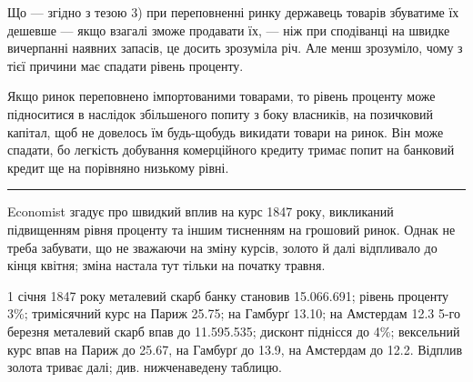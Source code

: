 
Що — згідно з тезою 3) при переповненні ринку державець товарів збуватиме
їх дешевше — якщо взагалі зможе продавати їх, — ніж при сподіванці на
швидке вичерпанні наявних запасів, це досить зрозуміла річ. Але менш зрозуміло,
чому з тієї причини має спадати рівень проценту.

Якщо ринок переповнено імпортованими товарами, то рівень проценту може
підноситися в наслідок збільшеного попиту з боку власників, на позичковий
капітал, щоб не довелось їм будь-щобудь викидати товари на ринок. Він може
спадати, бо легкість добування комерційного кредиту тримає попит на банковий
кредит ще на порівняно низькому рівні.

\pfbreak

Economist згадує про швидкий вплив на курс 1847 року, викликаний
підвищенням рівня проценту та іншим тисненням на грошовий ринок. Однак не
треба забувати, що не зважаючи на зміну курсів, золото й далі відпливало
до кінця квітня; зміна настала тут тільки на початку травня.

1 січня 1847 року металевий скарб банку становив \num{15.066.691};
рівень проценту 3\%; тримісячний курс на Париж 25.75; на Гамбурґ 13.10;
на Амстердам 12.3 5-го березня металевий скарб впав до \num{11.595.535};
дисконт піднісся до 4\%; вексельний курс впав на Париж до 25.67, на Гамбурґ
до 13.9, на Амстердам до 12.2. Відплив золота триває далі; див.
нижченаведену таблицю.


